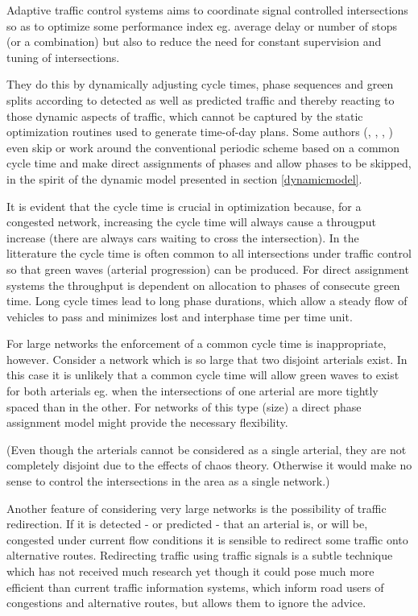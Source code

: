 \label{adaptive_cooperation}
Adaptive traffic control systems aims to coordinate signal controlled intersections so as to optimize some performance index eg. average delay or number of stops (or a combination) but also to reduce the need for constant supervision and tuning of intersections.

They do this by dynamically adjusting cycle times, phase sequences and green splits according to detected as well as predicted traffic and thereby reacting to those dynamic aspects of traffic, which cannot be captured by the static optimization routines used to generate time-of-day plans. Some authors (\cite{1}, \cite{44}, \cite{46}, \cite{scoot2004}) even skip or work around the conventional periodic scheme based on a common cycle time and make direct assignments of phases and allow phases to be skipped, in the spirit of the dynamic model presented in section \ref{dynamicmodel}. 

It is evident that the cycle time is crucial in optimization because, for a congested network, increasing the cycle time will always cause a througput increase (there are always cars waiting to cross the intersection). In the litterature the cycle time is often common to all intersections under traffic control so that green waves (arterial progression) can be produced. For direct assignment systems the throughput is dependent on allocation to phases of consecute green time. Long cycle times lead to long phase durations, which allow a steady flow of vehicles to pass and minimizes lost and interphase time per time unit.

For large networks the enforcement of a common cycle time is inappropriate, however. Consider a network which is so large that two disjoint arterials exist. In this case it is unlikely that a common cycle time will allow green waves to exist for both arterials eg. when the intersections of one arterial are more tightly spaced than in the other. For networks of this type (size) a direct phase assignment model might provide the necessary flexibility.

(Even though the arterials cannot be considered as a single arterial, they are not completely disjoint due to the effects of chaos theory. Otherwise it would make no sense to control the intersections in the area as  a single network.)

Another feature of considering very large networks is the possibility of traffic redirection. If it is detected - or predicted - that an arterial is, or will be, congested under current flow conditions it is sensible to redirect some traffic onto alternative routes. 
Redirecting traffic using traffic signals is a subtle technique which has not received much research yet though it could pose much more efficient than current traffic information systems, which inform road users of congestions and alternative routes, but allows them to ignore the advice.

